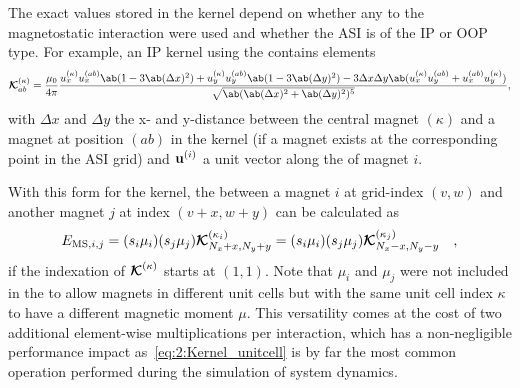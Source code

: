 The exact values stored in the kernel depend on whether any  to the magnetostatic interaction were used and whether the ASI is of the IP or OOP type.
For example, an IP kernel using the  contains elements
\begin{equation}
	\label{eq:2:Kernel_detailed}
	\vc{\mathcal{K}}^{(\kappa)}_{ab} = \frac{\mu_0}{4 \pi} \frac{
		u_x^{(\kappa)} u_x^{(ab)} \ab(1 - 3 \ab(\Delta x)^2) + u_y^{(\kappa)} u_y^{(ab)} \ab(1 - 3 \ab(\Delta y)^2) - 3\Delta x \Delta y \ab(u_x^{(\kappa)} u_y^{(ab)} + u_x^{(ab)} u_y^{(\kappa)})
	}{
		\sqrt{\ab(\ab(\Delta x)^2 + \ab(\Delta y)^2)^5}
	} \mathrm{,}
\end{equation}
with $\Delta x$ and $\Delta y$ the x- and y-distance between the central magnet $(\kappa)$ and a magnet at position $(ab)$ in the kernel (if a magnet exists at the corresponding point in the ASI grid) and $\boldsymbol{\mathbf{u}}^{(i)}$ a unit vector along the  of magnet $i$. \par
With this form for the kernel, the  between a magnet $i$ at grid-index $(v,w)$ and another magnet $j$ at index $(v+x, w+y)$ can be calculated as
\begin{equation}
	\label{eq:2:Kernel_unitcell}
	E_{\mathrm{MS},i,j} = (s_i \mu_i) (s_j \mu_j) \boldsymbol{\mathbf{\mathcal{K}}}^{(\kappa_i)}_{N_x+x, N_y+y} = (s_i \mu_i) (s_j \mu_j) \boldsymbol{\mathbf{\mathcal{K}}}^{(\kappa_j)}_{N_x-x, N_y-y} \quad \mathrm{,}
\end{equation}
if the indexation of $\boldsymbol{\mathbf{\mathcal{K}}}^{(\kappa)}$ starts at $(1,1)$.
Note that $\mu_i$ and $\mu_j$ were not included in the  to allow magnets in different unit cells but with the same unit cell index $\kappa$ to have a different magnetic moment $\mu$.
This versatility comes at the cost of two additional element-wise multiplications per interaction, which has a non-negligible performance impact as~\cref{eq:2:Kernel_unitcell} is by far the most common operation performed during the simulation of system dynamics. \\\par

